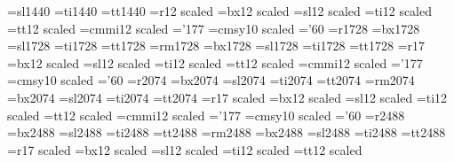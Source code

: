   \font\frtsl=\fontid sl1440
  \font\frtit=\fontid ti1440
  \font\frttt=\fontid tt1440
\else
  \font\frtrm=\fontid r12 scaled 
  \font\frtbf=\fontid bx12 scaled 
  \font\frtsl=\fontid sl12 scaled 
  \font\frtit=\fontid ti12 scaled 
  \font\frttt=\fontid tt12 scaled 
\fi
\fi
%
%
\font\svti=cmmi12 scaled  \skewchar\svti='177
\font\svtsy=cmsy10 scaled  \skewchar\svtsy='60
\iflongDCfontnames
  \font\svtrm=\fontid r1728
  \font\svtbf=\fontid bx1728
  \font\svtsl=\fontid sl1728
  \font\svtit=\fontid ti1728
  \font\svttt=\fontid tt1728
\else\iflongECfontnames
  \font\svtrm=\fontid rm1728
  \font\svtbf=\fontid bx1728
  \font\svtsl=\fontid sl1728
  \font\svtit=\fontid ti1728
  \font\svttt=\fontid tt1728
\else
  \font\svtrm=\fontid r17
  \font\svtbf=\fontid bx12 scaled 
  \font\svtsl=\fontid sl12 scaled 
  \font\svtit=\fontid ti12 scaled 
  \font\svttt=\fontid tt12 scaled 
\fi
\fi
%
%
\font\twtyi=cmmi12 scaled  \skewchar\twtyi='177
\font\twtysy=cmsy10 scaled \skewchar\twtysy='60
\iflongDCfontnames
  \font\twtyrm=\fontid r2074
  \font\twtybf=\fontid bx2074
  \font\twtysl=\fontid sl2074
  \font\twtyit=\fontid ti2074
  \font\twtytt=\fontid tt2074
\else\iflongECfontnames
  \font\twtyrm=\fontid rm2074
  \font\twtybf=\fontid bx2074
  \font\twtysl=\fontid sl2074
  \font\twtyit=\fontid ti2074
  \font\twtytt=\fontid tt2074
\else
  \font\twtyrm=\fontid r17 scaled 
  \font\twtybf=\fontid bx12 scaled 
  \font\twtysl=\fontid sl12 scaled 
  \font\twtyit=\fontid ti12 scaled 
  \font\twtytt=\fontid tt12 scaled 
\fi
\fi
%
%
\font\twfvi=cmmi12 scaled  \skewchar\twfvi='177
\font\twfvsy=cmsy10 scaled  \skewchar\twfvsy='60
\iflongDCfontnames
  \font\twfvrm=\fontid r2488
  \font\twfvbf=\fontid bx2488
  \font\twfvsl=\fontid sl2488
  \font\twfvit=\fontid ti2488
  \font\twfvtt=\fontid tt2488
\else\iflongECfontnames
  \font\twfvrm=\fontid rm2488
  \font\twfvbf=\fontid bx2488
  \font\twfvsl=\fontid sl2488
  \font\twfvit=\fontid ti2488
  \font\twfvtt=\fontid tt2488
\else
  \font\twfvrm=\fontid r17 scaled 
  \font\twfvbf=\fontid bx12 scaled 
  \font\twfvsl=\fontid sl12 scaled 
  \font\twfvit=\fontid ti12 scaled 
  \font\twfvtt=\fontid tt12 scaled 
\fi
\fi
%
%
\def\twfvpoint{\Twfvpoint}
\def\Twfvpoint{\normalbaselineskip=30pt
\def\rm{\fam0\twfvrm}%
\def\it{\fam\itfam\twfvit}%
\def\sl{\fam\slfam\twfvsl}%
\def\bf{\fam\bffam\twfvbf}%
\def\smc{\twfvrm}%
\def\mit{\fam 1}%
\def\cal{\fam 2}%
\textfont0=\twfvrm   \scriptfont0=\twtyrm   \scriptscriptfont0=\svtrm
\textfont1=\twfvi    \scriptfont1=\twtyi    \scriptscriptfont1=\svti
\textfont2=\twfvsy   \scriptfont2=\twtysy   \scriptscriptfont2=\svtsy
\textfont3=\tenex   \scriptfont3=\tenex     \scriptscriptfont3=\tenex
\textfont\itfam=\twfvit \scriptfont\itfam=\twtyit
\textfont\slfam=\twfvsl \scriptfont\slfam=\twtysl
\textfont\bffam=\twfvbf \scriptfont\bffam=\twtybf
\scriptscriptfont\bffam=\twtybf
\setbox\strutbox=\hbox{\vrule height 22pt depth 8pt width 0pt}%
\def\tt{\twfvtt}\normalbaselines\rm}
